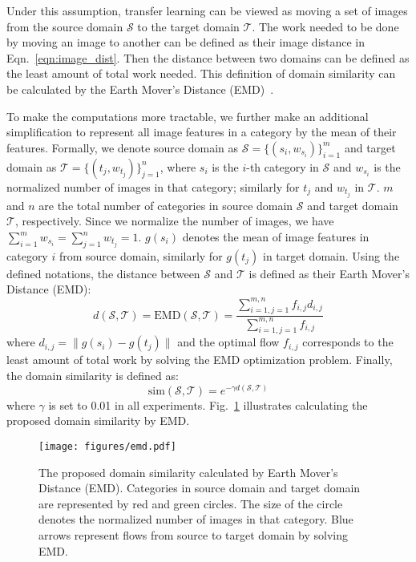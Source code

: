 \documentclass[10pt,twocolumn,letterpaper]{article}
\begin{document}
Under this assumption, transfer learning can be viewed as moving a set of images from the source domain $\mathcal{S}$ to the target domain $\mathcal{T}$.
The work needed to be done by moving an image to another can be defined as their image distance in Eqn.\ \ref{eqn:image_dist}.
Then the distance between two domains can be defined as the least amount of total work needed.
This definition of domain similarity can be calculated by the Earth Mover's Distance (EMD)~\cite{emd, emd_2}.

To make the computations more tractable, we further make an additional simplification to represent all image features in a category by the mean of their features.
Formally, we denote source domain as $\mathcal{S} = \{ (s_i, w_{s_i}) \}_{i=1}^m$ and target domain as $\mathcal{T} = \{ (t_j, w_{t_j}) \}_{j=1}^n$, where $s_i$ is the $i$-th category in $\mathcal{S}$ and $w_{s_i}$ is the normalized number of images in that category; similarly for $t_j$ and $w_{t_j}$ in $\mathcal{T}$.
$m$ and $n$ are the total number of categories in source domain $\mathcal{S}$ and target domain $\mathcal{T}$, respectively.
Since we normalize the number of images, we have $\sum_{i=1}^m w_{s_i} = \sum_{j=1}^n w_{t_j} = 1$.
$g(s_i)$ denotes the mean of image features in category $i$ from source domain, similarly for $g(t_j)$ in target domain.
Using the defined notations, the distance between $\mathcal{S}$ and $\mathcal{T}$ is defined as their Earth Mover's Distance (EMD):
\begin{equation}
\label{eqn:emd}
d(\mathcal{S}, \mathcal{T}) = \text{EMD}(\mathcal{S}, \mathcal{T}) = \frac{\sum_{i=1, j=1}^{m, n} f_{i,j} d_{i,j}}{\sum_{i=1, j=1}^{m, n} f_{i,j}}
\end{equation}
where $d_{i, j}=\lVert g(s_i)-g(t_j)\rVert$ and the optimal flow $f_{i, j}$  corresponds to the least amount of total work by solving the EMD optimization problem.
Finally, the domain similarity is defined as:
\begin{equation}
\label{eqn:domain_similarity}
\text{sim}(\mathcal{S}, \mathcal{T}) = e^{-\gamma d(\mathcal{S}, \mathcal{T})}
\end{equation}
where $\gamma$ is set to 0.01 in all experiments.
Fig.\ \ref{fig:emd} illustrates calculating the proposed domain similarity by EMD.


\begin{figure}[t]
\begin{center}
\texttt{[image: figures/emd.pdf]}
\end{center}
\caption{The proposed domain similarity calculated by Earth Mover's Distance (EMD). Categories in source domain and target domain are represented by red and green circles. The size of the circle denotes the normalized number of images in that category. Blue arrows represent flows from source to target domain by solving EMD.}
\label{fig:emd}
\end{figure}
\end{document}
